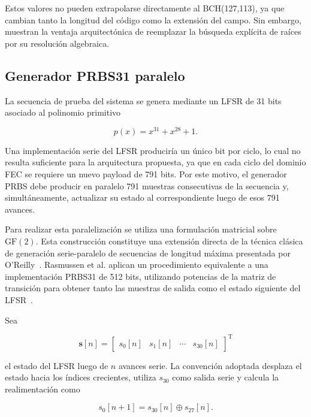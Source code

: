 \documentclass[10pt,a4paper]{article}
\begin{document}
Estos valores no pueden extrapolarse directamente al BCH(127,113), ya que
cambian tanto la longitud del código como la extensión del campo. Sin embargo,
muestran la ventaja arquitectónica de reemplazar la búsqueda explícita de
raíces por su resolución algebraica.

\subsection{Generador PRBS31 paralelo}

La secuencia de prueba del sistema se genera mediante un LFSR de 31 bits
asociado al polinomio primitivo

\begin{equation}
    p(x)=x^{31}+x^{28}+1.
\end{equation}

Una implementación serie del LFSR produciría un único bit por ciclo, lo cual
no resulta suficiente para la arquitectura propuesta, ya que en cada ciclo del
dominio FEC se requiere un nuevo payload de 791 bits. Por este motivo, el
generador PRBS debe producir en paralelo 791 muestras consecutivas de la
secuencia y, simultáneamente, actualizar su estado al correspondiente luego de
esos 791 avances.

Para realizar esta paralelización se utiliza una formulación matricial sobre
$\mathrm{GF}(2)$. Esta construcción constituye una extensión directa de la
técnica clásica de generación serie-paralelo de secuencias de longitud máxima
presentada por O'Reilly~\cite{oreilly1975}. Rasmussen et al. aplican un
procedimiento equivalente a una implementación PRBS31 de 512 bits, utilizando
potencias de la matriz de transición para obtener tanto las muestras de salida
como el estado siguiente del LFSR~\cite{rasmussen2010}.

Sea

\begin{equation}
    \mathbf{s}[n]
    =
    \begin{bmatrix}
        s_0[n] &
        s_1[n] &
        \cdots &
        s_{30}[n]
    \end{bmatrix}^{\mathrm{T}}
\end{equation}

el estado del LFSR luego de $n$ avances serie. La convención adoptada desplaza
el estado hacia los índices crecientes, utiliza $s_{30}$ como salida serie y
calcula la realimentación como

\begin{equation}
    s_0[n+1]=s_{30}[n]\oplus s_{27}[n].
\end{equation}
\end{document}
